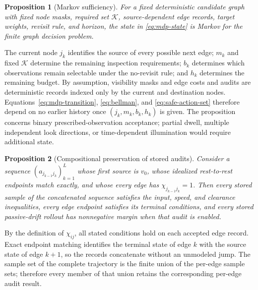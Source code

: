 \documentclass{IEEEtaes}
\newtheorem{proposition}{Proposition}
\theoremstyle{remark}
\theoremstyle{plain}
\begin{document}
\begin{proposition}[Markov sufficiency]
\label{prop:markov-sufficiency}
For a fixed deterministic candidate graph with fixed node masks, required set $\mathcal K$, source-dependent edge records, target weights, revisit rule, and horizon, the state in \eqref{eq:mdp-state} is Markov for the finite graph decision problem.
\end{proposition}

\begin{IEEEproof}
The current node $j_k$ identifies the source of every possible next edge; $m_k$ and fixed $\mathcal K$ determine the remaining inspection requirements; $b_k$ determines which observations remain selectable under the no-revisit rule; and $h_k$ determines the remaining budget. By assumption, visibility masks and edge costs and audits are deterministic records indexed only by the current and destination nodes. Equations~\eqref{eq:mdp-transition}, \eqref{eq:bellman}, and \eqref{eq:safe-action-set} therefore depend on no earlier history once $(j_k,m_k,b_k,h_k)$ is given. The proposition concerns binary prescribed-observation acceptance; partial dwell, multiple independent look directions, or time-dependent illumination would require additional state.
\end{IEEEproof}

\begin{proposition}[Compositional preservation of stored audits]
\label{prop:audit-composition}
Consider a sequence $(a_{j_{k-1}j_k})_{k=1}^{L}$ whose first source is $v_0$, whose idealized rest-to-rest endpoints match exactly, and whose every edge has $\chi_{j_{k-1}j_k}=1$. Then every stored sample of the concatenated sequence satisfies the input, speed, and clearance inequalities, every edge endpoint satisfies its terminal conditions, and every stored passive-drift rollout has nonnegative margin when that audit is enabled.
\end{proposition}

\begin{IEEEproof}
By the definition of $\chi_{ij}$, all stated conditions hold on each accepted edge record. Exact endpoint matching identifies the terminal state of edge $k$ with the source state of edge $k+1$, so the records concatenate without an unmodeled jump. The sample set of the complete trajectory is the finite union of the per-edge sample sets; therefore every member of that union retains the corresponding per-edge audit result.
\end{IEEEproof}
\end{document}
